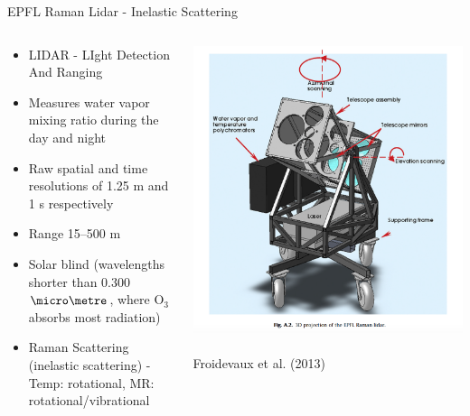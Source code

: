 
\begin{frame}{EPFL Raman Lidar - Inelastic Scattering}
  
  \setlength{\fboxsep}{0pt}
\setlength{\fboxrule}{1pt}
\begin{columns}[T]
    \begin{column}{.55\textwidth}
    \begin{minipage}[c][.7\textheight][c]{\linewidth}
    \begin{itemize}
    	\item LIDAR - LIght Detection And Ranging
    	\item Measures water vapor mixing ratio during the day and night
    	\item Raw spatial and time resolutions of 1.25 m and 1 s respectively
    	\item Range 15–500 m
    	\item Solar blind (wavelengths shorter than 0.300 $\micro\metre$, where O$_3$ absorbs most radiation)
    	\item Raman Scattering (inelastic scattering) - Temp: rotational, MR: rotational/vibrational
    \end{itemize}
      \end{minipage}
    \end{column}
    \begin{column}{.55\textwidth}
      \includegraphics[width=\textwidth]{fig6.png}
      \centering \tiny~\\Froidevaux et al. (2013)
    \end{column}
  \end{columns}
  
\end{frame}

